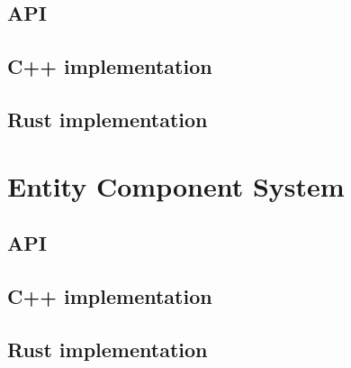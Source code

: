 \subsection{API}
\blindtext
\subsection{C++ implementation}
\blindtext
\subsection{Rust implementation}
\blindtext
\section{Entity Component System} \label{ecs_impl}
\blindtext
\subsection{API}
\blindtext
\subsection{C++ implementation}
\blindtext
\subsection{Rust implementation}
\blindtext